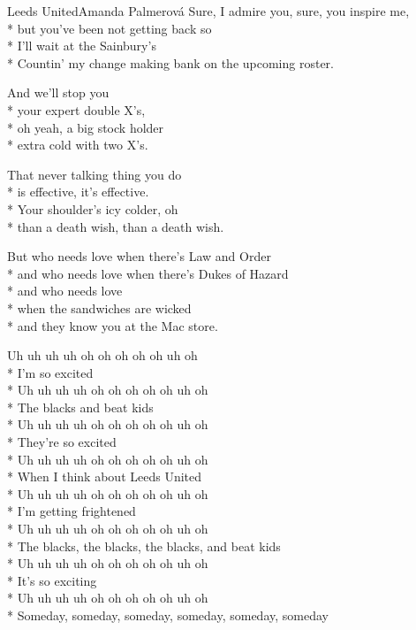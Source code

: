 \documentclass[10.5pt]{book}
\begin{document}
\begin{poem}{Leeds United}{Amanda Palmerová}
Sure, I admire you, sure, you inspire me,\\*
but you've been not getting back so\\*
I'll wait at the Sainbury's\\*
Countin' my change making bank on the upcoming roster.

And we'll stop you\\*
your expert double X's,\\*
oh yeah, a big stock holder\\*
extra cold with two X's.

That never talking thing you do\\*
is effective, it's effective.\\*
Your shoulder's icy colder, oh\\*
than a death wish, than a death wish.

But who needs love when there's Law and Order\\*
and who needs love when there's Dukes of Hazard\\*
and who needs love\\*
when the sandwiches are wicked\\*
and they know you at the Mac store.

Uh uh uh uh oh oh oh oh oh uh oh\\*
I'm so excited\\*
Uh uh uh uh oh oh oh oh oh uh oh\\*
The blacks and beat kids\\*
Uh uh uh uh oh oh oh oh oh uh oh\\*
They're so excited\\*
Uh uh uh uh oh oh oh oh oh uh oh\\*
When I think about Leeds United\\*
Uh uh uh uh oh oh oh oh oh uh oh\\*
I'm getting frightened\\*
Uh uh uh uh oh oh oh oh oh uh oh\\*
The blacks, the blacks, the blacks, and beat kids\\*
Uh uh uh uh oh oh oh oh oh uh oh\\*
It's so exciting\\*
Uh uh uh uh oh oh oh oh oh uh oh\\*
Someday, someday, someday, someday, someday, \mbox{someday}

\end{poem}
\fi
\iffalse
\end{document}
